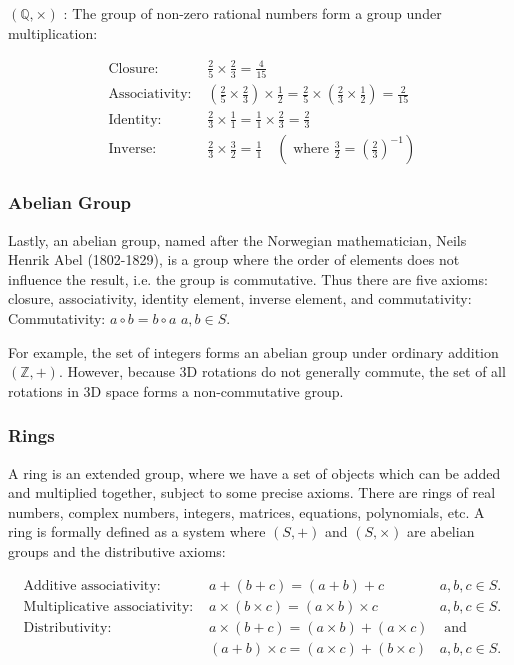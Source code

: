 $(\mathbb{Q}, \times)$ : The group of non-zero rational numbers form a group under multiplication:

$$
\begin{aligned}
\text { Closure: } & \frac{2}{5} \times \frac{2}{3}=\frac{4}{15} \\
\text { Associativity: } & \left(\frac{2}{5} \times \frac{2}{3}\right) \times \frac{1}{2}=\frac{2}{5} \times\left(\frac{2}{3} \times \frac{1}{2}\right)=\frac{2}{15} \\
\text { Identity: } & \frac{2}{3} \times \frac{1}{1}=\frac{1}{1} \times \frac{2}{3}=\frac{2}{3} \\
\text { Inverse: } & \frac{2}{3} \times \frac{3}{2}=\frac{1}{1} \quad\left(\text { where } \frac{3}{2}=\left(\frac{2}{3}\right)^{-1}\right)
\end{aligned}
$$

\subsubsection{Abelian Group}
Lastly, an abelian group, named after the Norwegian mathematician, Neils Henrik Abel (1802-1829), is a group where the order of elements does not influence the result, i.e. the group is commutative. Thus there are five axioms: closure, associativity, identity element, inverse element, and commutativity:
Commutativity:
$a \circ b=b \circ a$
$a, b \in S$.

For example, the set of integers forms an abelian group under ordinary addition $(\mathbb{Z},+)$. However, because 3D rotations do not generally commute, the set of all rotations in 3D space forms a non-commutative group.

\subsubsection{Rings}
A ring is an extended group, where we have a set of objects which can be added and multiplied together, subject to some precise axioms. There are rings of real numbers, complex numbers, integers, matrices, equations, polynomials, etc. A ring is formally defined as a system where $(S,+)$ and $(S, \times)$ are abelian groups and the distributive axioms:

$$
\begin{array}{lll}
\text { Additive associativity: } & a+(b+c)=(a+b)+c & a, b, c \in S . \\
\text { Multiplicative associativity: } & a \times(b \times c)=(a \times b) \times c & a, b, c \in S . \\
\text { Distributivity: } & a \times(b+c)=(a \times b)+(a \times c) & \text { and } \\
& (a+b) \times c=(a \times c)+(b \times c) & a, b, c \in S .
\end{array}
$$

